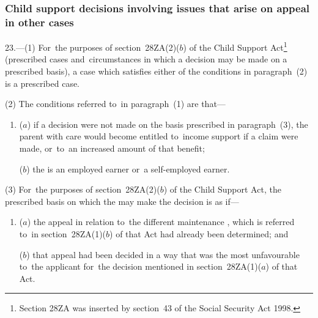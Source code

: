 \documentclass[12pt,a4paper]{article}
\begin{document}

\subsubsection[23. Child support decisions involving issues that arise on appeal in other cases]{Child support decisions involving issues that arise on appeal in other cases}

23.—(1) For~the purposes of section~28ZA(2)($b$) of the Child Support Act\footnote{\frenchspacing Section 28ZA was inserted by section~43 of the Social Security Act 1998.} (prescribed cases and~circumstances in which a decision may be made on a prescribed basis), a case which satisfies either of the conditions in paragraph~(2) is a prescribed case.

(2) The conditions referred to~in paragraph~(1) are that—
\begin{enumerate}\item[]
($a$) if a decision were not made on the basis prescribed in paragraph~(3), the parent with care would become entitled to~income support if a claim were made, or~to~an increased amount of that benefit;

($b$) the 
%
is an employed earner or~a self-employed earner.
\end{enumerate}

(3) For~the purposes of section~28ZA(2)($b$) of the Child Support Act, the prescribed basis on which the 
%
may make the decision is as if—
\begin{enumerate}\item[]
($a$) the appeal in relation to~the different maintenance 
%
, which is referred to~in section~28ZA(1)($b$) of that Act had already been determined; and

($b$) that appeal had been decided in a way that was the most unfavourable to~the applicant for~the decision mentioned in section~28ZA(1)($a$) of that Act.
\end{enumerate}
\end{document}
